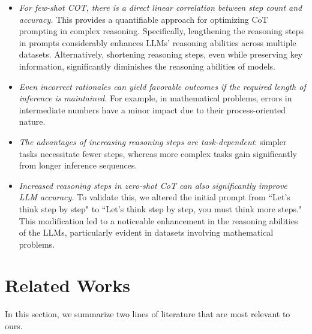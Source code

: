 \documentclass[11pt]{article}
\begin{document}
\begin{itemize}[leftmargin=*]\setlength\itemsep{-0.3em}

\item \emph{For few-shot COT, there is a direct linear correlation between step count and accuracy.} This provides a quantifiable approach for optimizing CoT prompting in complex reasoning. Specifically, lengthening the reasoning steps in prompts considerably enhances LLMs' reasoning abilities across multiple datasets. Alternatively, shortening reasoning steps, even while preserving key information, significantly diminishes the reasoning abilities of models. 

\item \emph{Even incorrect rationales can yield favorable outcomes if the required length of inference is maintained.} For example, in mathematical problems, errors in intermediate numbers have a minor impact due to their process-oriented nature.


\item \emph{The advantages of increasing reasoning steps are task-dependent}: simpler tasks necessitate fewer steps, whereas more complex tasks gain significantly from longer inference sequences. 

\item \emph{Increased reasoning steps in zero-shot CoT can also significantly improve LLM accuracy.} To validate this, we altered the initial prompt from ``Let's think step by step" to ``Let's think step by step, you must think more steps." This modification led to a noticeable enhancement in the reasoning abilities of the LLMs, particularly evident in datasets involving mathematical problems.

\end{itemize}
\section{Related Works}
In this section, we summarize two lines of literature that are most relevant to ours. 
\end{document}
